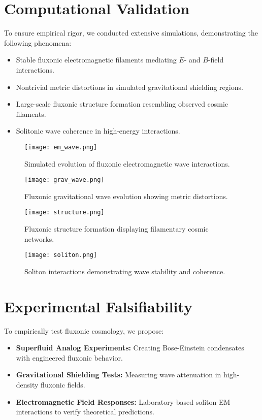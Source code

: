 \documentclass{article}
\begin{document}
\section{Computational Validation}
To ensure empirical rigor, we conducted extensive simulations, demonstrating the following phenomena:

\begin{itemize}
    \item Stable fluxonic electromagnetic filaments mediating \(E\)- and \(B\)-field interactions.
    \item Nontrivial metric distortions in simulated gravitational shielding regions.
    \item Large-scale fluxonic structure formation resembling observed cosmic filaments.
    \item Solitonic wave coherence in high-energy interactions.
\end{itemize}

\begin{figure}[h]
    \centering
    \texttt{[image: em\_wave.png]}
    \caption{Simulated evolution of fluxonic electromagnetic wave interactions.}
    \label{fig:em_wave}
\end{figure}

\begin{figure}[h]
    \centering
    \texttt{[image: grav\_wave.png]}
    \caption{Fluxonic gravitational wave evolution showing metric distortions.}
    \label{fig:grav_wave}
\end{figure}

\begin{figure}[h]
    \centering
    \texttt{[image: structure.png]}
    \caption{Fluxonic structure formation displaying filamentary cosmic networks.}
    \label{fig:structure}
\end{figure}

\begin{figure}[h]
    \centering
    \texttt{[image: soliton.png]}
    \caption{Soliton interactions demonstrating wave stability and coherence.}
    \label{fig:soliton}
\end{figure}

\section{Experimental Falsifiability}
To empirically test fluxonic cosmology, we propose:
\begin{itemize}
    \item \textbf{Superfluid Analog Experiments:} Creating Bose-Einstein condensates with engineered fluxonic behavior.
    \item \textbf{Gravitational Shielding Tests:} Measuring wave attenuation in high-density fluxonic fields.
    \item \textbf{Electromagnetic Field Responses:} Laboratory-based soliton-EM interactions to verify theoretical predictions.
\end{itemize}
\end{document}
